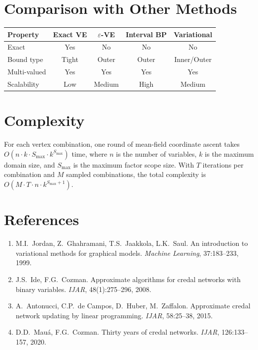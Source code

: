 \documentclass[11pt]{article}
\begin{document}
\section{Comparison with Other Methods}

\begin{center}
\begin{tabular}{lcccc}
\toprule
\textbf{Property} & \textbf{Exact VE} & \textbf{$\varepsilon$-VE} & \textbf{Interval BP} & \textbf{Variational} \\
\midrule
Exact & Yes & No & No & No \\
Bound type & Tight & Outer & Outer & Inner/Outer \\
Multi-valued & Yes & Yes & Yes & Yes \\
Scalability & Low & Medium & High & Medium \\
\bottomrule
\end{tabular}
\end{center}

\section{Complexity}

For each vertex combination, one round of mean-field coordinate ascent takes
$O(n \cdot k \cdot S_{\max} \cdot k^{S_{\max}})$ time, where $n$ is the number of
variables, $k$ is the maximum domain size, and $S_{\max}$ is the maximum factor
scope size. With $T$ iterations per combination and $M$ sampled combinations, the
total complexity is $O(M \cdot T \cdot n \cdot k^{S_{\max}+1})$.

\section{References}

\begin{enumerate}
\item M.I.\ Jordan, Z.\ Ghahramani, T.S.\ Jaakkola, L.K.\ Saul. An introduction to
      variational methods for graphical models. \emph{Machine Learning}, 37:183--233, 1999.
\item J.S.\ Ide, F.G.\ Cozman. Approximate algorithms for credal networks with binary
      variables. \emph{IJAR}, 48(1):275--296, 2008.
\item A.\ Antonucci, C.P.\ de Campos, D.\ Huber, M.\ Zaffalon. Approximate credal
      network updating by linear programming. \emph{IJAR}, 58:25--38, 2015.
\item D.D.\ Mau\'a, F.G.\ Cozman. Thirty years of credal networks. \emph{IJAR},
      126:133--157, 2020.
\end{enumerate}
\end{document}
